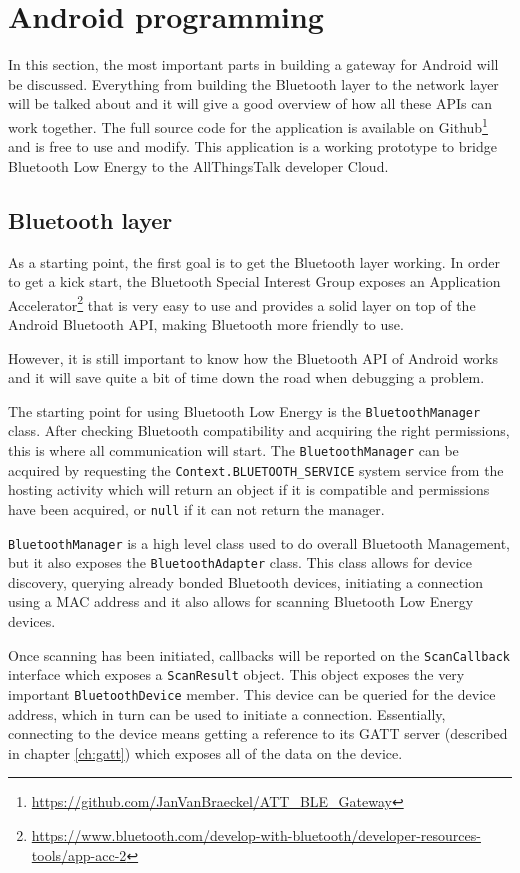 \documentclass[pdftex,a4paper,12pt,twoside]{report}
\begin{document}
\section{Android programming}
\label{sec:androidprogramming}
In this section, the most important parts in building a gateway for Android will be discussed. Everything from building the Bluetooth layer to the network layer will be talked about and it will give a good overview of how all these APIs can work together. The full source code for the application is available on Github\footnote{\url{https://github.com/JanVanBraeckel/ATT_BLE_Gateway}} and is free to use and modify. This application is a working prototype to bridge Bluetooth Low Energy to the AllThingsTalk developer Cloud.

\subsection{Bluetooth layer}
\label{subsec:bluetoothlayer}
As a starting point, the first goal is to get the Bluetooth layer working. In order to get a kick start, the Bluetooth Special Interest Group exposes an Application Accelerator\footnote{\url{https://www.bluetooth.com/develop-with-bluetooth/developer-resources-tools/app-acc-2}} that is very easy to use and provides a solid layer on top of the Android Bluetooth API, making Bluetooth more friendly to use.

However, it is still important to know how the Bluetooth API of Android works and it will save quite a bit of time down the road when debugging a problem.

The starting point for using Bluetooth Low Energy is the \texttt{BluetoothManager} class. After checking Bluetooth compatibility and acquiring the right permissions, this is where all communication will start. The \texttt{BluetoothManager} can be acquired by requesting the \texttt{Context.BLUETOOTH\_SERVICE} system service from the hosting activity which will return an object if it is compatible and permissions have been acquired, or \texttt{null} if it can not return the manager.

\texttt{BluetoothManager} is a high level class used to do overall Bluetooth Management, but it also exposes the \texttt{BluetoothAdapter} class. This class allows for device discovery, querying already bonded Bluetooth devices, initiating a connection using a MAC address and it also allows for scanning Bluetooth Low Energy devices.

Once scanning has been initiated, callbacks will be reported on the \texttt{ScanCallback} interface which exposes a \texttt{ScanResult} object. This object exposes the very important \texttt{BluetoothDevice} member. This device can be queried for the device address, which in turn can be used to initiate a connection. Essentially, connecting to the device means getting a reference to its GATT server (described in chapter \ref{ch:gatt}) which exposes all of the data on the device.
\end{document}
